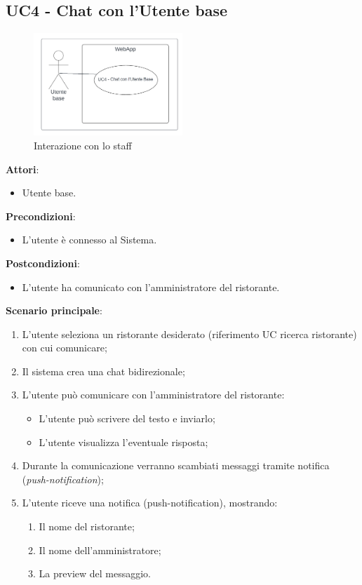 \subsection{UC4 - Chat con l'Utente base}\label{usecase:4}
\begin{figure}[H]
  \centering
  \includegraphics[width=0.5\textwidth]{ucd/UCD4.png}
  \caption{Interazione con lo staff}
\end{figure}
\textbf{Attori}:
\begin{itemize}
    \item Utente base.
\end{itemize}
\textbf{Precondizioni}:
\begin{itemize}
    \item L'utente è connesso al Sistema.
\end{itemize}
\textbf{Postcondizioni}:
\begin{itemize}
    \item L'utente ha comunicato con l'amministratore del ristorante.
\end{itemize}
\textbf{Scenario principale}:
\begin{enumerate}
    \item L'utente seleziona un ristorante desiderato (riferimento UC ricerca ristorante) con cui comunicare;
    \item Il sistema crea una chat bidirezionale;
    \item L'utente può comunicare con l'amministratore del ristorante:
    \begin{itemize}
        \item L'utente può scrivere del testo e inviarlo;
        \item L'utente visualizza l'eventuale risposta;
    \end{itemize}
    \item Durante la comunicazione verranno scambiati messaggi tramite notifica (\textit{push-notification});
    \item L'utente riceve una notifica (push-notification), mostrando:
    \begin{enumerate}
        \item Il nome del ristorante;
        \item Il nome dell'amministratore;
        \item La preview del messaggio.
    \end{enumerate}
\end{enumerate}
